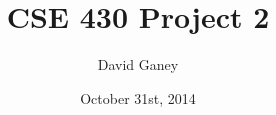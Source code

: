 \documentclass[]{article}
\begin{document}
\lstset{language=C++}

\begin{spacing}{.4}
\setlength{\droptitle}{-7em}
\title{CSE 430 Project 2}
\author{David Ganey}
\date{October 31st, 2014}
\maketitle
\end{spacing}
\end{document}
